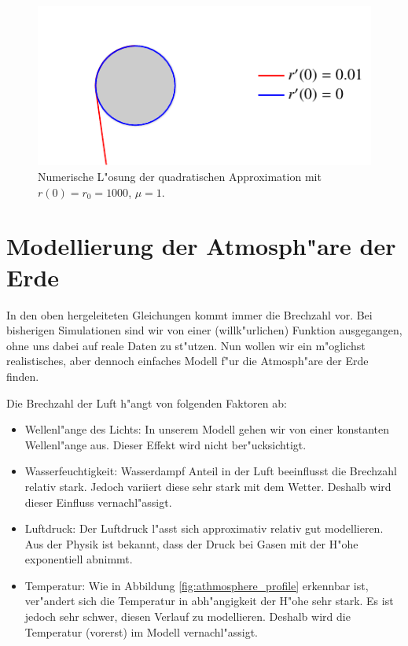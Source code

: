 \begin{refsection}
\begin{figure}
\end{figure}

\begin{figure}
  \centering
  \includegraphics[scale=1]{licht/standalone/fig_kreis_square2.pdf}
  \caption{Numerische L"osung der quadratischen Approximation mit $r(0) = r_0 = 1000$,  $\mu = 1$. \label{fig:sphere_special4} } 
\end{figure}


\section{Modellierung der Atmosph"are der Erde}

In den oben hergeleiteten Gleichungen kommt immer die Brechzahl vor. 
Bei bisherigen Simulationen sind wir von einer (willk"urlichen) Funktion ausgegangen, ohne uns dabei auf reale Daten zu st"utzen. 
Nun wollen wir ein m"oglichst realistisches, aber dennoch einfaches Modell f"ur die Atmosph"are der Erde finden.

Die Brechzahl der Luft h"angt von folgenden Faktoren ab:
\begin{itemize}
  \item Wellenl"ange des Lichts: In unserem Modell gehen wir von einer konstanten Wellenl"ange aus. Dieser Effekt wird nicht ber"ucksichtigt.
  \item Wasserfeuchtigkeit: Wasserdampf Anteil in der Luft beeinflusst die Brechzahl relativ stark. Jedoch variiert diese sehr stark mit dem Wetter. Deshalb wird dieser Einfluss vernachl"assigt. 
  \item Luftdruck: Der Luftdruck l"asst sich approximativ relativ gut modellieren. Aus der Physik ist bekannt, dass der Druck bei Gasen mit der H"ohe exponentiell abnimmt. 
  \item Temperatur: Wie in Abbildung \ref{fig:athmosphere_profile} erkennbar ist, ver"andert sich die Temperatur in abh"angigkeit der H"ohe sehr stark. Es ist jedoch sehr schwer, diesen Verlauf zu modellieren. Deshalb wird die Temperatur (vorerst) im Modell vernachl"assigt.
\end{itemize}


\end{refsection}
